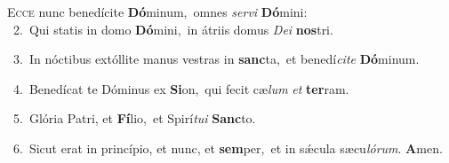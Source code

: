 \lettrine{\initial\textcolor{\initialcolor}{E}}{cce} nunc benedícite \textbf{Dó}\-minum,~\star omnes \textit{ser}\-\textit{vi} \textbf{Dó}\-mini:\\
{\numbfont\textcolor{\numbcolor}{~2.}}~Qui statis in domo \textbf{Dó}\-mini,~\star in átriis domus \textit{De}\-\textit{i} \textbf{nos}\-tri.\par
{\numbfont\textcolor{\numbcolor}{~3.}}~In nóctibus extóllite manus vestras in \textbf{sanc}\-ta,~\star et benedí\-\textit{ci}\-\textit{te} \textbf{Dó}\-minum.\par
{\numbfont\textcolor{\numbcolor}{~4.}}~Benedícat te Dóminus ex \textbf{Si}\-on,~\star qui fecit cæ\textit{lum} \textit{et} \textbf{ter}\-ram.\par
{\numbfont\textcolor{\numbcolor}{~5.}}~Glória Patri, et \textbf{Fí}\-lio,~\star et Spirí\-\textit{tu}\-\textit{i} \textbf{Sanc}\-to.\par
{\numbfont\textcolor{\numbcolor}{~6.}}~Sicut erat in princípio, et nunc, et \textbf{sem}\-per,~\star et in sǽcula sæcu\-\textit{ló}\-\textit{rum}. \textbf{A}\-men.\par

